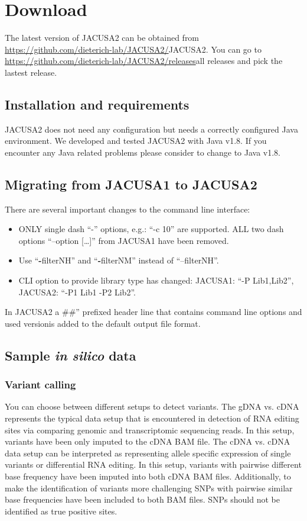 \documentclass[10pt,a4paper]{article}
\begin{document}
\section{Download}
The latest version of JACUSA2 can be obtained from \url{https://github.com/dieterich-lab/JACUSA2/}{JACUSA2}.
You can go to \url{https://github.com/dieterich-lab/JACUSA2/releases}{all releases} and pick the lastest release.
\subsection{Installation and requirements}
JACUSA2 does not need any configuration but needs a correctly configured Java environment.
We developed and tested JACUSA2 with Java v1.8. If you encounter any Java related problems please
consider to change to Java v1.8.
\subsection{Migrating from JACUSA1 to JACUSA2}\label{sec:migration}
There are several important changes to the command line interface:
\begin{itemize}
  \item ONLY single dash ``-'' options, e.g.: ``-c 10'' are supported. ALL two dash options ``--option [\ldots]'' from JACUSA1 have been removed.
  \item Use ``\textbf{-}filterNH'' and ``\textbf{-}filterNM'' instead of ``--filterNH''. 
	\item CLI option to provide library type has changed: JACUSA1: ``-P Lib1,Lib2'', JACUSA2: ``-P1 Lib1 -P2 Lib2''.
\end{itemize}
In JACUSA2 a \#\#'' prefixed header line that contains command line options and used versionis added 
to the default output file format.
\subsection{Sample \textit{in silico} data}
\subsubsection{Variant calling}
You can choose between different setups to detect variants. The gDNA vs. cDNA represents the typical 
data setup that is encountered in detection of RNA editing sites via comparing genomic and transcriptomic 
sequencing reads. In this setup, variants have been only imputed to the cDNA BAM file. The cDNA vs. cDNA 
data setup can be interpreted as representing allele specific expression of single variants or differential 
RNA editing. In this setup, variants with pairwise different base frequency have been imputed into both 
cDNA BAM files. Additionally, to make the identification of variants more challenging SNPs with pairwise similar base
frequencies have been included to both BAM files. SNPs should not be identified as true positive sites.
\end{document}

